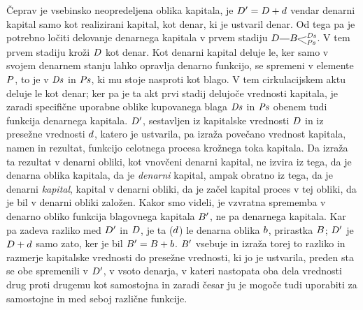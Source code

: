 \documentclass[kapital_02.tex]{subfiles}
\begin{document}
Čeprav je vsebinsko neopredeljena oblika kapitala, je \(D' = D + d\) vendar denarni kapital samo kot realizirani kapital, kot denar, ki je ustvaril denar. Od tega pa je potrebno ločiti delovanje denarnega kapitala v prvem stadiju \(\KPED\KPEcrta\KPEBrazcepDsPs\). V tem prvem stadiju kroži \(D\) kot denar. Kot denarni kapital deluje le, ker samo v svojem denarnem stanju lahko opravlja denarno funkcijo, se spremeni v elemente \(P\), to je v \(\mathit{Ds}\) in \(\mathit{Ps}\), ki mu stoje nasproti kot blago. V tem cirkulacijskem aktu deluje le kot denar; ker pa je ta akt prvi stadij delujoče vrednosti kapitala, je zaradi specifične uporabne oblike kupovanega blaga \(\mathit{Ds}\) in \(\mathit{Ps}\) obenem tudi funkcija denarnega kapitala. \(D'\), sestavljen iz kapitalske vrednosti \(D\) in iz presežne vrednosti \(d\), katero je ustvarila, pa izraža povečano vrednost kapitala, namen in rezultat, funkcijo celotnega procesa krožnega toka kapitala. Da izraža ta rezultat v denarni obliki, kot vnovčeni denarni kapital, ne izvira iz tega, da je denarna oblika kapitala, da je \emph{denarni} kapital, ampak obratno iz tega, da je denarni \emph{kapital}, kapital v denarni obliki, da je začel kapital proces v tej obliki, da je bil v denarni obliki založen. Kakor smo videli, je vzvratna sprememba v denarno obliko funkcija blagovnega kapitala \(B'\), ne pa denarnega kapitala. Kar pa zadeva razliko med \(D'\) in \(D\), je ta (\(d\)) le denarna oblika \(b\), prirastka \(B\); \(D'\) je \(D + d\) samo zato, ker je bil \(B' = B + b\). \(B'\) vsebuje in izraža torej to razliko in razmerje kapitalske vrednosti do presežne vrednosti, ki jo je ustvarila, preden sta se obe spremenili v \(D'\), v vsoto denarja, v kateri nastopata oba dela vrednosti drug proti drugemu kot samostojna in zaradi česar ju je mogoče tudi uporabiti za samostojne in med seboj različne funkcije.
\end{document}
